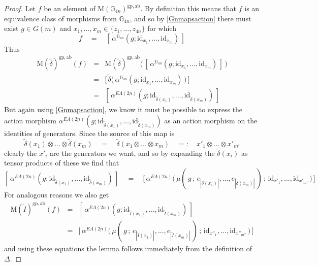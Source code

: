 \documentclass{amsbook} %
\newcommand{\ELnn}{E\Lambda(\underline{2n})}
\numberwithin{section}{chapter}
\begin{document}
\begin{proof}  
Let $f$ be an element of $\mathrm{M}(\mathbb{G}_{4n})^{\mathrm{gp, ab}}$. By definition this means that $f$ is an equivalence class of morphisms from $\mathbb{G}_{4n}$, and so by \cref{Gnmapsaction} there must exist $g \in G(m)$ and $x_1, ..., x_m \in \{ z_1, ..., z_{4n} \}$ for which
\[ f \quad = \quad [ \, \alpha^{\mathbb{G}_{4n}}(g; \mathrm{id}_{x_1}, ..., \mathrm{id}_{x_m}) \, ] \]
Thus
\[ \begin{array}{rll}
			\mathrm{M}(\tilde{\delta})^{\mathrm{gp, ab}}(f) & = & \mathrm{M}(\tilde{\delta})^{\mathrm{gp, ab}} \big( \, [ \, \alpha^{\mathbb{G}_{4n}}(g; \mathrm{id}_{x_1}, ..., \mathrm{id}_{x_m}) \, ] \, \big) \\
			& = & \big[ \, \tilde{\delta}\big( \, \alpha^{\mathbb{G}_{4n}}(g; \mathrm{id}_{x_1}, ..., \mathrm{id}_{x_m}) \, \big) \, \big]  \\
			& = & [ \, \alpha^{\ELnn}(g; \mathrm{id}_{\tilde{\delta}(x_1)}, ..., \mathrm{id}_{\tilde{\delta}(x_m)}) \, ]
		\end{array}
\]
But again using \cref{Gnmapsaction}, we know it must be possible to express the action morphism $\alpha^{\ELnn}(g; \mathrm{id}_{\tilde{\delta}(x_1)}, ..., \mathrm{id}_{\tilde{\delta}(x_m)})$ as an action morphism on the identities of generators. Since the source of this map is
\[ \tilde{\delta}(x_1) \otimes ... \otimes \tilde{\delta}(x_m) \quad = \quad \tilde{\delta}(x_1 \otimes ... \otimes x_m) \quad =: \quad x'_1 \otimes ... \otimes x'_{m'}  \]
clearly the $x'_i$ are the generators we want, and so by expanding the $\tilde{\delta}(x_i)$ as tensor products of these we find that
\[ [ \, \alpha^{\ELnn}(g; \mathrm{id}_{\tilde{\delta}(x_1)}, ..., \mathrm{id}_{\tilde{\delta}(x_m)})  \, ] \quad = \quad \big[ \, \alpha^{\ELnn}\big( \, \mu( \, g \, ; \, e_{|\tilde{\delta}(x_1)|}, ..., e_{|\tilde{\delta}(x_m)|} \, ) \, ; \, \mathrm{id}_{x'_1}, ..., \mathrm{id}_{x'_{m'}} \, \big) \, \big] \]
For analogous reasons we also get
\[ \begin{array}{rll}
			\mathrm{M}(\tilde{I})^{\mathrm{gp, ab}}(f) & = & [ \, \alpha^{\ELnn}(g; \mathrm{id}_{\tilde{I}(x_1)}, ..., \mathrm{id}_{\tilde{I}(x_m)}) \, ]  \\
			& = &  \big[ \, \alpha^{\ELnn}\big( \, \mu( \, g \, ; \, e_{|\tilde{I}(x_1)|}, ..., e_{|\tilde{I}(x_m)|} \, ) \, ; \, \mathrm{id}_{x''_1}, ...,  \mathrm{id}_{x''_{m''}} \, \big) \, \big]
		\end{array}
\]
and using these equations the lemma follows immediately from the definition of $\Delta$.
\end{proof}
\end{document}
